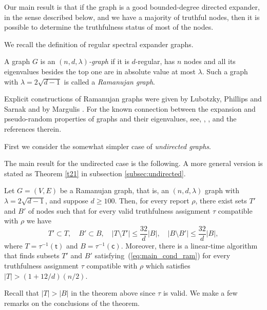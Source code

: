 \documentclass{toc}
\begin{document}
Our main result is that if the graph is a good bounded-degree 
directed expander, in the sense described below,
and we have a majority of truthful nodes, then it is possible to
%
determine  %
the truthfulness status of
most of the nodes.   %
%
%

We recall the
%
definition of regular spectral expander graphs.
%
\begin{definition} \label{dec:ndl}
A graph $G$ is an
\emph{$(n,d, \lambda)$-graph} if it is $d$-regular, has $n$ nodes and all
its eigenvalues besides the top one are in absolute value at most
$\lambda$.  Such a graph with $\lambda=2 \sqrt {d-1}$ is called a
\emph{Ramanujan graph}.
\end{definition} 
%
%
%
Explicit constructions of Ramanujan graphs were given by Lubotzky,
Phillips and Sarnak \cite{LPS} and by Margulis \cite{Ma}.
%
%
For the known connection between the 
expansion and pseudo-random properties of graphs and their eigenvalues,
see, \eg, \cite{AC}, \cite{HLW} and the references therein.

%
%
%
%
%
%
%
%
%

%
%
%
%
%
%
%
%
%
%

%
%
%
%
%
%
%
First we consider the somewhat simpler case of \emph{undirected graphs}.
%
%

%

%
The main result for the undirected case
is the following. A more general version is stated as Theorem 
\ref{t21} in subsection \ref{subsec:undirected}.

%
%
%
\begin{theorem}  
\label{t11}
Let $G = (V,E)$ be a Ramanujan graph, that is, an
$(n,d,\lambda)$ graph with $\lambda =2 \sqrt{d-1}$, and
suppose $d \geq 100$.  Then, for every report
$\rho$, there exist sets $T'$ and $B'$ of nodes
such that for every valid truthfulness assignment
$\tau$ compatible with $\rho$ we have
\begin{equation}
\label{eq:main_cond_ram}
T' \subset T, \quad B' \subset B, \quad
|T \setminus T'| \leq \frac{32}{d} |B| , \quad
|B \setminus B'| \leq  \frac{32}{d} |B|,
\end{equation}
where $T = \tau^{-1}(\mathsf{t})$ and $B =  \tau^{-1}(\mathsf{c})$.
%
%
%
%
%
%
Moreover, there is a linear-time
algorithm that finds subsets $T'$ and 
$B'$ satisfying~(\ref{eq:main_cond_ram})
for every truthfulness assignment $\tau$  
compatible with $\rho$ which satisfies
$|T| >  (1 +  {12}/{d}) ({n}/{2})$.
\end{theorem}
Recall that $|T| > |B|$ in the theorem  above since $\tau$ is valid.
%
%
%
%
We make a few remarks on the conclusions of the theorem.
%
%
\end{document}
